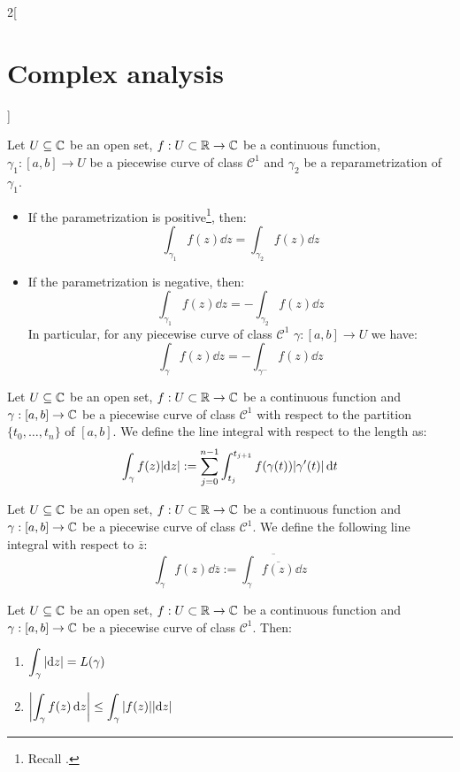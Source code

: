 \documentclass[../../../main_math.tex]{subfiles}
\begin{document}
\begin{multicols}{2}[\section{Complex analysis}]
\begin{proposition}
    Let $U\subseteq \mathbb{C}$ be an open set, $f:U\subset\mathbb{R}\rightarrow\mathbb{C}$ be a continuous function, $\gamma_1:[a,b]\rightarrow U$ be a piecewise curve of class $\mathcal{C}^1$ and $\gamma_2$ be a reparametrization of $\gamma_1$.
    \begin{itemize}
      \item If the parametrization is positive\footnote{Recall .}, then: $$\int_{\gamma_1}f(z)\dd{z}=\int_{\gamma_2}f(z)\dd{z}$$
      \item If the parametrization is negative, then: $$\int_{\gamma_1}f(z)\dd{z}=-\int_{\gamma_2}f(z)\dd{z}$$
            In particular, for any piecewise curve of class $\mathcal{C}^1$ $\gamma:[a,b]\rightarrow U$ we have: $$\int_{\gamma}f(z)\dd{z}=-\int_{\gamma^-}f(z)\dd{z}$$
    \end{itemize}
  \end{proposition}
  \begin{definition}
    Let $U\subseteq \mathbb{C}$ be an open set, $f:U\subset\mathbb{R}\rightarrow\mathbb{C}$ be a continuous function and $\gamma:[a,b]\rightarrow\mathbb{C}$ be a piecewise curve of class $\mathcal{C}^1$ with respect to the partition $\{t_0,\ldots,t_n\}$ of $[a,b]$. We define the line integral with respect to the length as: $$\int_{\gamma}f(z)\abs{\dd{z}}:=\sum_{j=0}^{n-1}\int_{t_j}^{t_{j+1}}f(\gamma(t))|\gamma'(t)|\dd{t}$$
  \end{definition}
  \begin{definition}
    Let $U\subseteq \mathbb{C}$ be an open set, $f:U\subset\mathbb{R}\rightarrow\mathbb{C}$ be a continuous function and $\gamma:[a,b]\rightarrow\mathbb{C}$ be a piecewise curve of class $\mathcal{C}^1$. We define the following line integral with respect to $\overline{z}$: $$\int_{\gamma}f(z)\dd{\overline{z}}:=\overline{\int_{\gamma}\overline{f(z)}\dd{z}}$$
  \end{definition}
  \begin{proposition}
    Let $U\subseteq \mathbb{C}$ be an open set, $f:U\subset\mathbb{R}\rightarrow\mathbb{C}$ be a continuous function and $\gamma:[a,b]\rightarrow\mathbb{C}$ be a piecewise curve of class $\mathcal{C}^1$. Then:
    \begin{enumerate}
      \item $\displaystyle\int_{\gamma}\abs{\dd{z}}=L(\gamma)$
      \item $\displaystyle\left|\int_{\gamma}f(z)\dd{z}\right|\leq\int_{\gamma}|f(z)|\abs{\dd{z}}$
    \end{enumerate}
  \end{proposition}

\end{multicols}
\end{document}
